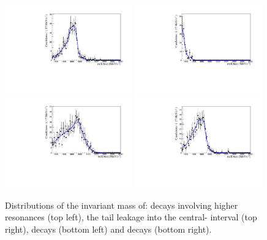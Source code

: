 \begin{figure}[t!]
\centering
\includegraphics[width=0.49\textwidth]{RKst/figs/Fit/fit_EE/rooKeysModel_bkg_partReco_KstEE_low_L0E__for_B0_PV_M.pdf}
\includegraphics[width=0.49\textwidth]{RKst/figs/Fit/fit_EE/rooKeysModel_bkg_leakJPs_KstEE_central_L0E__for_B0_PV_M.pdf}
\includegraphics[width=0.49\textwidth]{RKst/figs/Fit/fit_EE/rooKeysModel_bkg_Lb2pKJPs_KstJPsEE_L0E__for_B0_PV_M.pdf}
\includegraphics[width=0.49\textwidth]{RKst/figs/Fit/fit_EE/rooKeysModel_bkg_partReco_KstGEE_L0E__for_B0_PV_M.pdf}
\caption{Distributions of the \mKpiee invariant mass of: decays involving
higher \Kstarz resonances (top left), the \jpsi tail leakage into the central-\qsq 
interval (top right), \Lb decays (bottom left) and \BdToKstGee decays (bottom right).}
\label{fig:misreco}


\end{figure}
